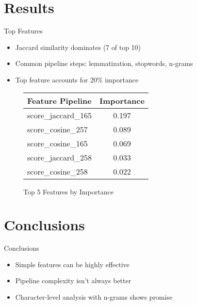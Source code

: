 \documentclass{beamer}
\begin{document}
\section{Results}
\begin{frame}{Top Features}
    \begin{itemize}
        \item Jaccard similarity dominates (7 of top 10)
        \item Common pipeline steps: lemmatization, stopwords, n-grams
        \item Top feature accounts for 20\% importance
    \end{itemize}
    \begin{figure}[h]
        \centering
        \begin{tabular}{|l|c|}
            \hline
            \textbf{Feature Pipeline} & \textbf{Importance} \\
            \hline
            score\_jaccard\_165 & 0.197 \\
            score\_cosine\_257 & 0.089 \\
            score\_cosine\_165 & 0.069 \\
            score\_jaccard\_258 & 0.033 \\
            score\_cosine\_258 & 0.022 \\
            \hline
        \end{tabular}
        \caption{Top 5 Features by Importance}
    \end{figure}
\end{frame}

\section{Conclusions}
\begin{frame}{Conclusions}
    \begin{itemize}
        \item Simple features can be highly effective
        \item Pipeline complexity isn't always better
        \item Character-level analysis with n-grams shows promise
    \end{itemize}
\end{frame}
\end{document}
